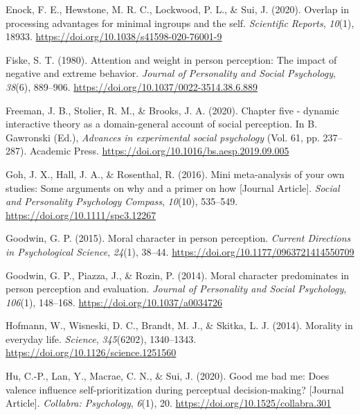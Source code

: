 \documentclass[
  man]{apa6}
\newlength{\cslhangindent}
\newlength{\cslentryspacingunit} %
\newenvironment{CSLReferences}[2] %
 {%
  \setlength{\parindent}{0pt}
  \ifodd #1
  \let\oldpar\par
  \def\par{\hangindent=\cslhangindent\oldpar}
  \fi
  \setlength{\parskip}{#2\cslentryspacingunit}
 }%
 {}
\begin{document}
\begin{CSLReferences}{1}{0}
\leavevmode{}%
Enock, F. E., Hewstone, M. R. C., Lockwood, P. L., \& Sui, J. (2020). Overlap in processing advantages for minimal ingroups and the self. \emph{Scientific Reports}, \emph{10}(1), 18933. \url{https://doi.org/10.1038/s41598-020-76001-9}

\leavevmode{}%
Fiske, S. T. (1980). Attention and weight in person perception: The impact of negative and extreme behavior. \emph{Journal of Personality and Social Psychology}, \emph{38}(6), 889--906. \url{https://doi.org/10.1037/0022-3514.38.6.889}

\leavevmode{}%
Freeman, J. B., Stolier, R. M., \& Brooks, J. A. (2020). Chapter five - dynamic interactive theory as a domain-general account of social perception. In B. Gawronski (Ed.), \emph{Advances in experimental social psychology} (Vol. 61, pp. 237--287). Academic Press. \url{https://doi.org/10.1016/bs.aesp.2019.09.005}

\leavevmode{}%
Goh, J. X., Hall, J. A., \& Rosenthal, R. (2016). Mini meta-analysis of your own studies: Some arguments on why and a primer on how {[}Journal Article{]}. \emph{Social and Personality Psychology Compass}, \emph{10}(10), 535--549. \url{https://doi.org/10.1111/spc3.12267}

\leavevmode{}%
Goodwin, G. P. (2015). Moral character in person perception. \emph{Current Directions in Psychological Science}, \emph{24}(1), 38--44. \url{https://doi.org/10.1177/0963721414550709}

\leavevmode{}%
Goodwin, G. P., Piazza, J., \& Rozin, P. (2014). Moral character predominates in person perception and evaluation. \emph{Journal of Personality and Social Psychology}, \emph{106}(1), 148--168. \url{https://doi.org/10.1037/a0034726}

\leavevmode{}%
Hofmann, W., Wisneski, D. C., Brandt, M. J., \& Skitka, L. J. (2014). Morality in everyday life. \emph{Science}, \emph{345}(6202), 1340--1343. \url{https://doi.org/10.1126/science.1251560}

\leavevmode{}%
Hu, C.-P., Lan, Y., Macrae, C. N., \& Sui, J. (2020). Good me bad me: Does valence influence self-prioritization during perceptual decision-making? {[}Journal Article{]}. \emph{Collabra: Psychology}, \emph{6}(1), 20. \url{https://doi.org/10.1525/collabra.301}


\end{CSLReferences}
\end{document}
